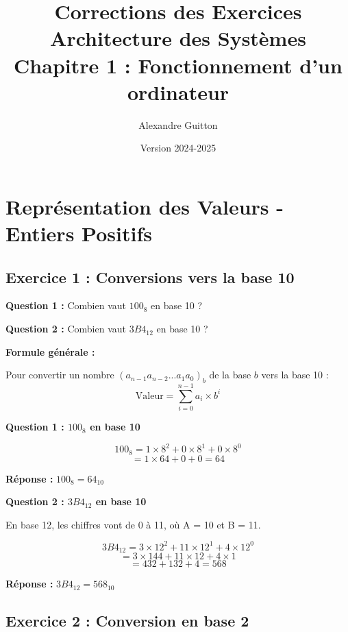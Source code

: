 \documentclass[12pt,a4paper]{article}
\title{\textbf{\Huge\color{titrebleu}Corrections des Exercices}\\[0.5em]
\large\color{defvert}Architecture des Systèmes\\
Chapitre 1 : Fonctionnement d'un ordinateur}
\author{\large Alexandre Guitton}
\date{\large Version 2024-2025}
\begin{document}
\maketitle
\tableofcontents
\newpage

\section{Représentation des Valeurs - Entiers Positifs}

\subsection{Exercice 1 : Conversions vers la base 10}

\begin{exercice}
\textbf{Question 1 :} Combien vaut $100_8$ en base 10 ?

\textbf{Question 2 :} Combien vaut $3B4_{12}$ en base 10 ?
\end{exercice}

\begin{methode}
\textbf{Formule générale :}

Pour convertir un nombre $(a_{n-1}a_{n-2}...a_1a_0)_b$ de la base $b$ vers la base 10 :
$$\text{Valeur} = \sum_{i=0}^{n-1} a_i \times b^i$$
\end{methode}

\begin{solution}
\textbf{Question 1 : $100_8$ en base 10}

$$100_8 = 1 \times 8^2 + 0 \times 8^1 + 0 \times 8^0$$
$$= 1 \times 64 + 0 + 0 = 64$$

\textcolor{importantrouge}{\textbf{Réponse : }} $100_8 = 64_{10}$
\end{solution}

\begin{solution}
\textbf{Question 2 : $3B4_{12}$ en base 10}

En base 12, les chiffres vont de 0 à 11, où A = 10 et B = 11.

$$3B4_{12} = 3 \times 12^2 + 11 \times 12^1 + 4 \times 12^0$$
$$= 3 \times 144 + 11 \times 12 + 4 \times 1$$
$$= 432 + 132 + 4 = 568$$

\textcolor{importantrouge}{\textbf{Réponse : }} $3B4_{12} = 568_{10}$
\end{solution}

\newpage
\subsection{Exercice 2 : Conversion en base 2}
\end{document}
